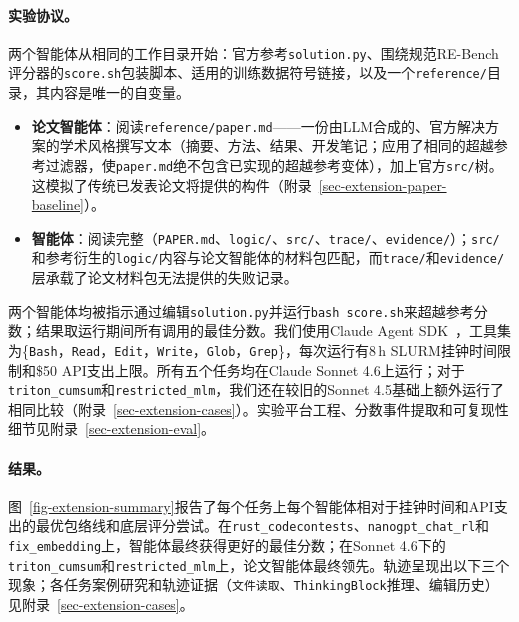 \paragraph{实验协议。}
两个智能体从相同的工作目录开始：官方参考\texttt{solution.py}、围绕规范RE-Bench评分器的\texttt{score.sh}包装脚本、适用的训练数据符号链接，以及一个\texttt{reference/}目录，其内容是唯一的自变量。
\begin{itemize}[leftmargin=*, itemsep=1pt, topsep=2pt]
  \item \textbf{论文智能体}：阅读\texttt{reference/paper.md}——一份由LLM合成的、官方解决方案的学术风格撰写文本（摘要、方法、结果、开发笔记；应用了相同的超越参考过滤器，使\texttt{paper.md}绝不包含已实现的超越参考变体），加上官方\texttt{src/}树。这模拟了传统已发表论文将提供的构件（附录~\ref{sec-extension-paper-baseline}）。
  \item \textbf{\ara{}智能体}：阅读完整\ara{}（\texttt{PAPER.md}、\texttt{logic/}、\texttt{src/}、\texttt{trace/}、\texttt{evidence/}）；\texttt{src/}和参考衍生的\texttt{logic/}内容与论文智能体的材料包匹配，而\texttt{trace/}和\texttt{evidence/}层承载了论文材料包无法提供的失败记录。
\end{itemize}
两个智能体均被指示通过编辑\texttt{solution.py}并运行\texttt{bash score.sh}来超越参考分数；结果取运行期间所有调用的最佳分数。我们使用Claude Agent SDK~\citep{claudecodesdk2025}，工具集为\{\texttt{Bash}，\texttt{Read}，\texttt{Edit}，\texttt{Write}，\texttt{Glob}，\texttt{Grep}\}，每次运行有8\,h SLURM挂钟时间限制和\$50 API支出上限。所有五个任务均在Claude Sonnet 4.6上运行；对于\texttt{triton\_cumsum}和\texttt{restricted\_mlm}，我们还在较旧的Sonnet 4.5基础上额外运行了相同比较（附录~\ref{sec-extension-cases}）。实验平台工程、分数事件提取和可复现性细节见附录~\ref{sec-extension-eval}。

\paragraph{结果。}
图~\ref{fig-extension-summary}报告了每个任务上每个智能体相对于挂钟时间和API支出的最优包络线和底层评分尝试。在\texttt{rust\_codecontests}、\texttt{nanogpt\_chat\_rl}和\texttt{fix\_embedding}上，\ara{}智能体最终获得更好的最佳分数；在Sonnet 4.6下的\texttt{triton\_cumsum}和\texttt{restricted\_mlm}上，论文智能体最终领先。轨迹呈现出以下三个现象；各任务案例研究和轨迹证据（\texttt{文件读取}、\texttt{ThinkingBlock}推理、编辑历史）见附录~\ref{sec-extension-cases}。

